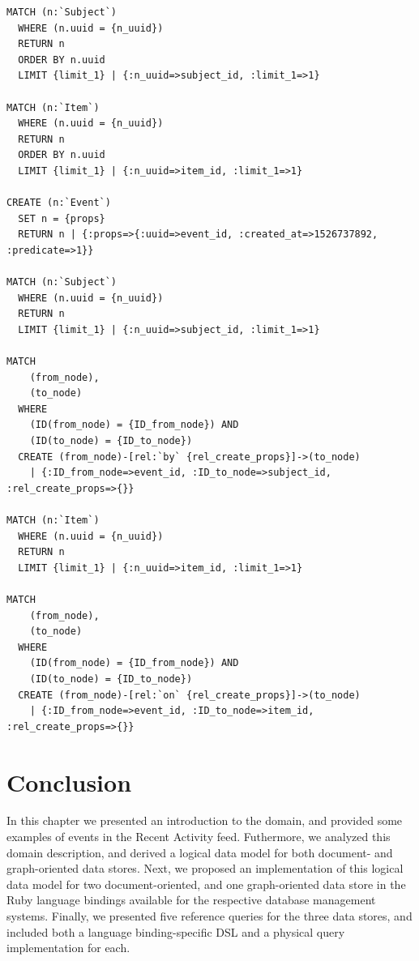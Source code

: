 \begin{verbatim}
MATCH (n:`Subject`)
  WHERE (n.uuid = {n_uuid})
  RETURN n
  ORDER BY n.uuid
  LIMIT {limit_1} | {:n_uuid=>subject_id, :limit_1=>1}

MATCH (n:`Item`)
  WHERE (n.uuid = {n_uuid})
  RETURN n
  ORDER BY n.uuid
  LIMIT {limit_1} | {:n_uuid=>item_id, :limit_1=>1}

CREATE (n:`Event`)
  SET n = {props}
  RETURN n | {:props=>{:uuid=>event_id, :created_at=>1526737892, :predicate=>1}}

MATCH (n:`Subject`)
  WHERE (n.uuid = {n_uuid})
  RETURN n
  LIMIT {limit_1} | {:n_uuid=>subject_id, :limit_1=>1}

MATCH
    (from_node),
    (to_node)
  WHERE
    (ID(from_node) = {ID_from_node}) AND
    (ID(to_node) = {ID_to_node})
  CREATE (from_node)-[rel:`by` {rel_create_props}]->(to_node)
    | {:ID_from_node=>event_id, :ID_to_node=>subject_id, :rel_create_props=>{}}

MATCH (n:`Item`)
  WHERE (n.uuid = {n_uuid})
  RETURN n
  LIMIT {limit_1} | {:n_uuid=>item_id, :limit_1=>1}

MATCH
    (from_node),
    (to_node)
  WHERE
    (ID(from_node) = {ID_from_node}) AND
    (ID(to_node) = {ID_to_node})
  CREATE (from_node)-[rel:`on` {rel_create_props}]->(to_node)
    | {:ID_from_node=>event_id, :ID_to_node=>item_id, :rel_create_props=>{}}

\end{verbatim}

\section{Conclusion}
\label{sec:data-model-conclusion}

In this chapter we presented an introduction to the domain, and provided some examples of events in the Recent Activity feed.
Futhermore, we analyzed this domain description, and derived a logical data model for both document- and graph-oriented data stores.
Next, we proposed an implementation of this logical data model for two document-oriented, and one graph-oriented data store in the Ruby language bindings available for the respective database management systems.
Finally, we presented five reference queries for the three data stores, and included both a language binding-specific DSL and a physical query implementation for each.

